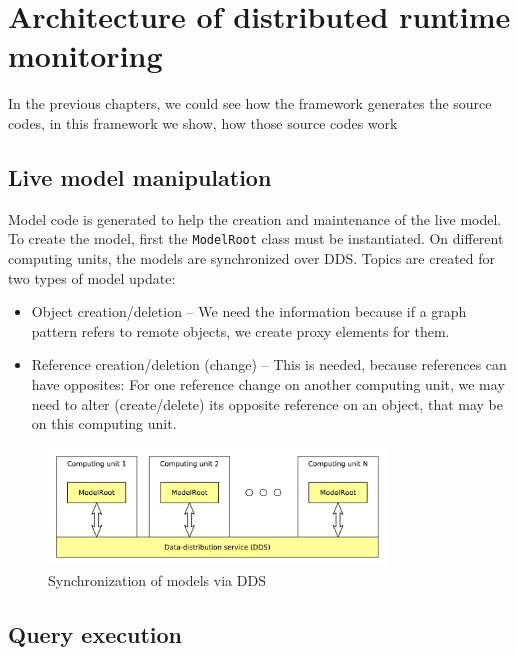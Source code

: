 %
\chapter{Architecture of distributed runtime monitoring}
%

In the previous chapters, we could see how the framework generates the source codes, in this framework we show, how those source codes work



\section{Live model manipulation}
Model code is generated to help the creation and maintenance of the live model.
To create the model, first the \texttt{ModelRoot} class must be instantiated.
On different computing units, the models are synchronized over DDS.
Topics are created for two types of model update:
\begin{itemize}
	\item Object creation/deletion -- We need the information because if a graph pattern refers to remote objects, we create proxy elements for them.  
	\item Reference creation/deletion (change) -- This is needed, because references can have opposites: For one reference change on another computing unit, we may need to alter (create/delete) its opposite reference on an object, that may be on this computing unit.
\end{itemize}

\begin{figure}[H]
	\begin{center}
		\includegraphics[width=0.8\textwidth]{figures/model-dds.pdf}
		\caption{ Synchronization of models via DDS }
		\label{fig:model-dds}
	\end{center}
\end{figure}

\section{Query execution}

